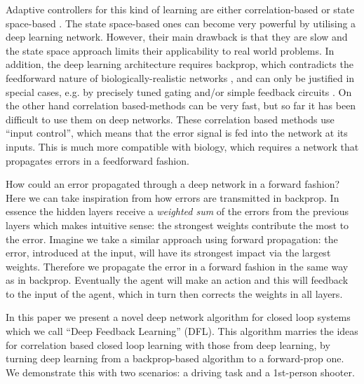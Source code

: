\documentclass{llncs}
\begin{document}
Adaptive controllers for this kind of learning are either
correlation-based \cite{PorrNecoISO2003,Verschure91} or state
space-based \cite{Dayan1992,Sutton98}. The state space-based ones can
become very powerful by utilising a deep learning network. However,
their main drawback is that they are slow and the state space approach
limits their applicability to real world problems. In addition, the
deep learning architecture requires backprop, which contradicts the
feedforward nature of biologically-realistic networks
\cite{Bennett2000}, and can only be justified in special cases,
e.g. by precisely tuned gating and/or simple feedback circuits
\cite{Lillicrap2016}. On the other hand correlation based-methods can
be very fast, but so far it has been difficult to use them on
deep networks.  These correlation based methods use ``input control'',
which means that the error signal is fed into the network at its
inputs. This is much more compatible with biology, which requires a
network that propagates errors in a feedforward fashion.

How could an error propagated through a deep network in a forward
fashion? Here we can take inspiration from how errors are transmitted
in backprop.  In essence the hidden layers receive a \textsl{weighted
  sum} of the errors from the previous layers which makes intuitive
sense: the strongest weights contribute the most to the error. Imagine
we take a similar approach using forward propagation: the error,
introduced at the input, will have its strongest impact via the
largest weights. Therefore we propagate the error in a forward fashion
in the same way as in backprop. Eventually the agent will make an
action and this will feedback to the input of the agent, which in turn
then corrects the weights in all layers.

In this paper we present a novel deep network algorithm for closed loop systems
which we call ``Deep Feedback Learning'' (DFL). This algorithm marries the
ideas for correlation based closed loop learning with those from deep learning,
by turning deep learning from a backprop-based algorithm to a forward-prop
one. We demonstrate this with two scenarios: a driving task and a 1st-person shooter.
\end{document}
